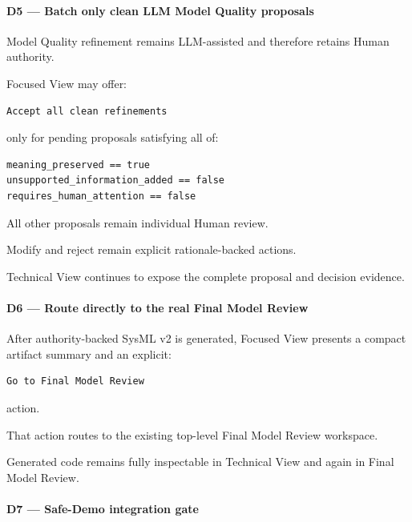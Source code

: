 \hypertarget{d5--batch-only-clean-llm-model-quality-proposals}{%
\paragraph{D5 --- Batch only clean LLM Model Quality proposals}\label{d5--batch-only-clean-llm-model-quality-proposals}}

Model Quality refinement remains LLM-assisted and therefore retains Human authority.

Focused View may offer:

\begin{verbatim}
Accept all clean refinements
\end{verbatim}

only for pending proposals satisfying all of:

\begin{verbatim}
meaning_preserved == true
unsupported_information_added == false
requires_human_attention == false
\end{verbatim}

All other proposals remain individual Human review.

Modify and reject remain explicit rationale-backed actions.

Technical View continues to expose the complete proposal and decision evidence.

\hypertarget{d6--route-directly-to-the-real-final-model-review}{%
\paragraph{D6 --- Route directly to the real Final Model Review}\label{d6--route-directly-to-the-real-final-model-review}}

After authority-backed SysML v2 is generated, Focused View presents a compact artifact summary and an explicit:

\begin{verbatim}
Go to Final Model Review
\end{verbatim}

action.

That action routes to the existing top-level Final Model Review workspace.

Generated code remains fully inspectable in Technical View and again in Final Model Review.

\hypertarget{d7--safe-demo-integration-gate}{%
\paragraph{D7 --- Safe-Demo integration gate}\label{d7--safe-demo-integration-gate}}

